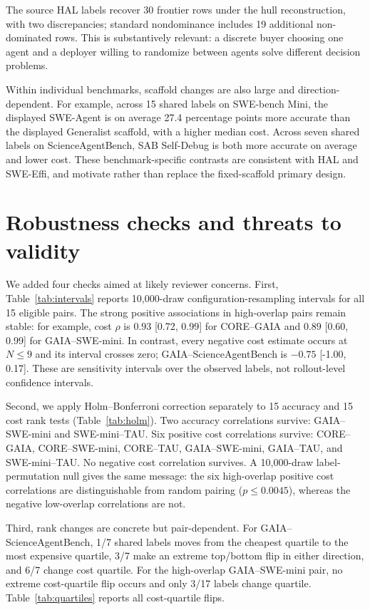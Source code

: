 \documentclass{article}
\newcommand{\rhoS}{\rho}
\begin{document}
The source HAL labels recover 30 frontier rows under the hull reconstruction, with two discrepancies; standard nondominance includes 19 additional non-dominated rows. This is substantively relevant: a discrete buyer choosing one agent and a deployer willing to randomize between agents solve different decision problems.

Within individual benchmarks, scaffold changes are also large and direction-dependent. For example, across 15 shared labels on SWE-bench Mini, the displayed SWE-Agent is on average 27.4 percentage points more accurate than the displayed Generalist scaffold, with a higher median cost. Across seven shared labels on ScienceAgentBench, SAB Self-Debug is both more accurate on average and lower cost. These benchmark-specific contrasts are consistent with HAL and SWE-Effi, and motivate rather than replace the fixed-scaffold primary design.

\section{Robustness checks and threats to validity}
\label{sec:robustness}

We added four checks aimed at likely reviewer concerns. First, Table~\ref{tab:intervals} reports 10,000-draw configuration-resampling intervals for all 15 eligible pairs. The strong positive associations in high-overlap pairs remain stable: for example, cost $\rhoS$ is $0.93$ [0.72, 0.99] for CORE--GAIA and $0.89$ [0.60, 0.99] for GAIA--SWE-mini. In contrast, every negative cost estimate occurs at $N\leq9$ and its interval crosses zero; GAIA--ScienceAgentBench is $-0.75$ [-1.00, 0.17]. These are sensitivity intervals over the observed labels, not rollout-level confidence intervals.

Second, we apply Holm--Bonferroni correction separately to 15 accuracy and 15 cost rank tests (Table~\ref{tab:holm}). Two accuracy correlations survive: GAIA--SWE-mini and SWE-mini--TAU. Six positive cost correlations survive: CORE--GAIA, CORE--SWE-mini, CORE--TAU, GAIA--SWE-mini, GAIA--TAU, and SWE-mini--TAU. No negative cost correlation survives. A 10,000-draw label-permutation null gives the same message: the six high-overlap positive cost correlations are distinguishable from random pairing ($p\leq0.0045$), whereas the negative low-overlap correlations are not.

Third, rank changes are concrete but pair-dependent. For GAIA--ScienceAgentBench, 1/7 shared labels moves from the cheapest quartile to the most expensive quartile, 3/7 make an extreme top/bottom flip in either direction, and 6/7 change cost quartile. For the high-overlap GAIA--SWE-mini pair, no extreme cost-quartile flip occurs and only 3/17 labels change quartile. Table~\ref{tab:quartiles} reports all cost-quartile flips.
\end{document}
